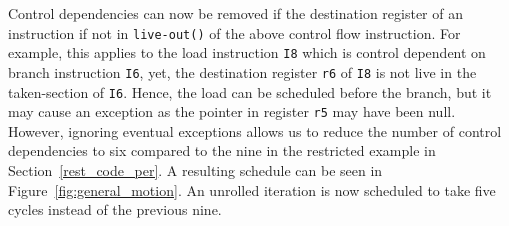 Control dependencies can now be removed if the destination register of an instruction if not in \texttt{live-out()} of the above control flow instruction. For example, this applies to the load instruction \texttt{I8} which is control dependent on branch instruction \texttt{I6}, yet, the destination register \texttt{r6} of \texttt{I8} is not live in the taken-section of \texttt{I6}. Hence, the load can be scheduled before the branch, but it may cause an exception as the pointer in register \texttt{r5} may have been null. However, ignoring eventual exceptions allows us to reduce the number of control dependencies to six compared to the nine in the restricted example in Section~\ref{rest_code_per}. A resulting schedule can be seen in Figure~\ref{fig:general_motion}. An unrolled iteration is now scheduled to take five cycles instead of the previous nine. 

